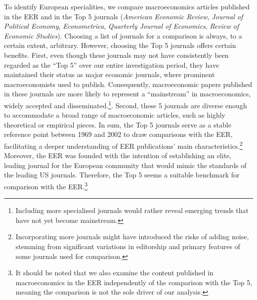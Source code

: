 \documentclass[
  12pt,
  onecolumn]{article}
\begin{document}
To identify European specialities, we compare macroeconomics articles published in the EER and in the Top 5 journals (\emph{American Economic Review}, \emph{Journal of Political Economy}, \emph{Econometrica}, \emph{Quarterly Journal of Economics}, \emph{Review of Economic Studies}). Choosing a list of journals for a comparison is always, to a certain extent, arbitrary. However, choosing the Top 5 journals offers certain benefits. First, even though these journals may not have consistently been regarded as the ``Top 5'' over our entire investigation period, they have maintained their status as major economic journals, where prominent macroeconomists used to publish. Consequently, macroeconomic papers published in these journals are more likely to represent a ``mainstream'' in macroeconomics, widely accepted and disseminated.\footnote{Including more specialised journals would rather reveal emerging trends that have not yet become mainstream.}. Second, these 5 journals are diverse enough to accommodate a broad range of macroeconomic articles, such as highly theoretical or empirical pieces. In sum, the Top 5 journals serve as a stable reference point between 1969 and 2002 to draw comparisons with the EER, facilitating a deeper understanding of EER publications' main characteristics.\footnote{Incorporating more journals might have introduced the risks of adding noise, stemming from significant variations in editorship and primary features of some journals used for comparison.} Moreover, the EER was founded with the intention of establishing an elite, leading journal for the European community that would mimic the standards of the leading US journals. Therefore, the Top 5 seems a suitable benchmark for comparison with the EER.\footnote{It should be noted that we also examine the content published in macroeconomics in the EER independently of the comparison with the Top 5, meaning the comparison is not the sole driver of our analysis.}
\end{document}
